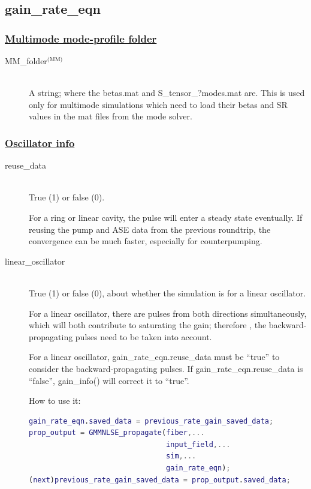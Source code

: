\documentclass[12pt,hidelinks]{book}
\begin{document}
\subsection{gain\_rate\_eqn}
\subsubsection{\underline{Multimode mode-profile folder}}
\begin{description}
\item[MM\_folder$^{\text{(MM)}}$]\mbox{}\\
A string; where the betas.mat and S\_tensor\_?modes.mat are. This is used only for multimode simulations which need to load their betas and SR values in the mat files from the mode solver.
\end{description}

\subsubsection{\underline{Oscillator info}}
\begin{description}
\item[\color{blue}reuse\_data]\mbox{}\\
True (1) or false (0).

For a ring or linear cavity, the pulse will enter a steady state eventually. If reusing the pump and ASE data from the previous roundtrip, the convergence can be much faster, especially for counterpumping.

\item[\color{blue}linear\_oscillator]\mbox{}\\
True (1) or false (0), about whether the simulation is for a linear oscillator.

For a linear oscillator, there are pulses from both directions simultaneously, which will both contribute to saturating the gain; therefore , the backward-propagating pulses need to be taken into account.

For a linear oscillator, gain\_rate\_eqn.reuse\_data must be ``true'' to consider the backward-propagating pulses. If gain\_rate\_eqn.reuse\_data is ``false'', gain\_info() will correct it to ``true''.

How to use it:
\begin{lstlisting}[language=MATLAB]
% previous_rate_gain_saved_data comes from the GMMNLSE_propagate() output from the previous roundtrip
gain_rate_eqn.saved_data = previous_rate_gain_saved_data;
prop_output = GMMNLSE_propagate(fiber,...
                                input_field,...
                                sim,...
                                gain_rate_eqn);
(next)previous_rate_gain_saved_data = prop_output.saved_data;
\end{lstlisting}
\end{description}
\end{document}
